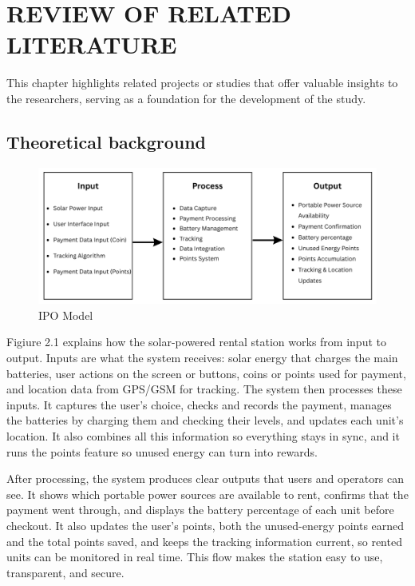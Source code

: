 \chapter{REVIEW OF RELATED LITERATURE}
{\baselineskip
This chapter highlights related projects or studies that offer valuable insights to the researchers, serving as a foundation for the development of the study.


\section{Theoretical background}

\begin{figure}[H]
	\centering
	\caption{IPO Model}
	\label{fig:theoretical}
	\includegraphics[width=1\textwidth]{figures/theoretical.png}
\end{figure}

Figiure 2.1 explains how the solar-powered rental station works from input to output. Inputs are what the system receives: solar energy that charges the main batteries, user actions on the screen or buttons, coins or points used for payment, and location data from GPS/GSM for tracking. The system then processes these inputs. It captures the user’s choice, checks and records the payment, manages the batteries by charging them and checking their levels, and updates each unit’s location. It also combines all this information so everything stays in sync, and it runs the points feature so unused energy can turn into rewards.

After processing, the system produces clear outputs that users and operators can see. It shows which portable power sources are available to rent, confirms that the payment went through, and displays the battery percentage of each unit before checkout. It also updates the user’s points, both the unused-energy points earned and the total points saved, and keeps the tracking information current, so rented units can be monitored in real time. This flow makes the station easy to use, transparent, and secure.


}
